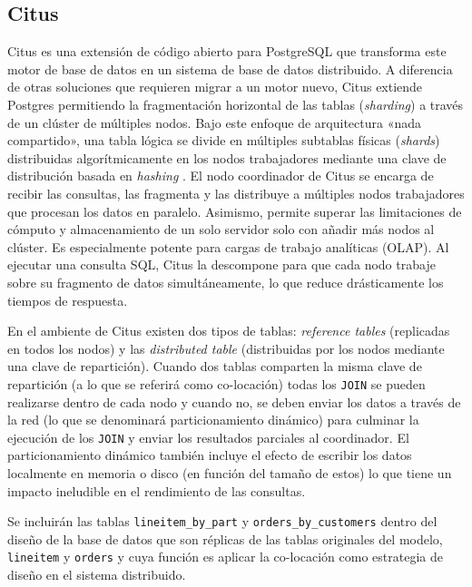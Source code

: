\documentclass[12pt, letter paper]{report}
\begin{document}
      \subsection{Citus} %
      \label{sub:citus}
        Citus es una extensión de código abierto para PostgreSQL que transforma
        este motor de base de datos en un sistema de base de datos distribuido.
        A diferencia de otras soluciones que requieren migrar a un motor nuevo,
        Citus extiende Postgres permitiendo la fragmentación horizontal de las
        tablas (\textit{sharding}) a través de un clúster de múltiples nodos.
        Bajo este enfoque de arquitectura «nada compartido», una tabla lógica se
        divide en múltiples subtablas físicas (\textit{shards}) distribuidas
        algorítmicamente en los nodos trabajadores mediante una clave de
        distribución basada en \textit{hashing} \cite{ozsu2020principles}. El
        nodo coordinador de Citus se encarga de recibir las consultas, las
        fragmenta y las distribuye a múltiples nodos trabajadores que procesan
        los datos en paralelo. Asimismo, permite superar las limitaciones de
        cómputo y almacenamiento de un solo servidor solo con añadir más nodos
        al clúster. Es especialmente potente para cargas de trabajo analíticas
        (OLAP). Al ejecutar una consulta SQL, Citus la descompone para que cada
        nodo trabaje sobre su fragmento de datos simultáneamente, lo que reduce
        drásticamente los tiempos de respuesta. \cite{citus_paper, citus_docs}

        En el ambiente de Citus existen dos tipos de tablas: \textit{reference
        tables} (replicadas en todos los nodos) y las \textit{distributed table}
        (distribuidas por los nodos mediante una clave de repartición). Cuando
        dos tablas comparten la misma clave de repartición (a lo que se referirá
        como co-locación) todas los \texttt{JOIN} se pueden realizarse dentro de
        cada nodo y cuando no, se deben enviar los datos a través de la red (lo
        que se denominará particionamiento dinámico) para culminar la ejecución
        de los \texttt{JOIN} y enviar los resultados parciales al coordinador.
        El particionamiento dinámico también incluye el efecto de escribir los
        datos localmente en memoria o disco (en función del tamaño de estos) lo
        que tiene un impacto ineludible en el rendimiento de las consultas.

        Se incluirán las tablas \texttt{lineitem\_by\_part} y
        \texttt{orders\_by\_customers} dentro del diseño de la base de datos que
        son réplicas de las tablas originales del modelo, \texttt{lineitem} y
        \texttt{orders} y cuya función es aplicar la co-locación como estrategia
        de diseño en el sistema distribuido.
\end{document}
